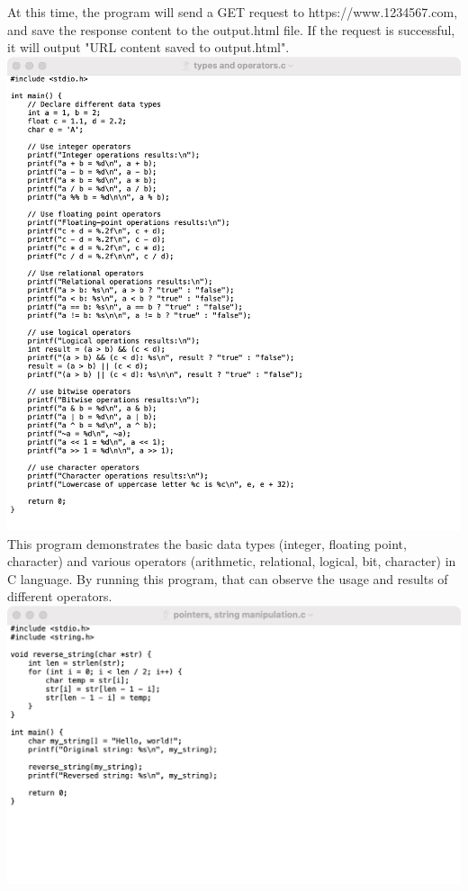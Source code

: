 \documentclass[a4paper, 11pt]{report}
\begin{document}
At this time, the program will send a GET request to https://www.1234567.com, and save the response content to the output.html file. If the request is successful, it will output "URL content saved to output.html".\\

\includegraphics[width=1\linewidth]{types and operators.jpeg}\\

This program demonstrates the basic data types (integer, floating point, character) and various operators (arithmetic, relational, logical, bit, character) in C language. By running this program, that can observe the usage and results of different operators.\\

\includegraphics[width=1\linewidth]{pointers, string manipulation.jpeg}\\
\end{document}
